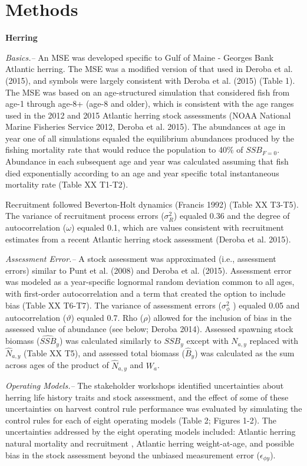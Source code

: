 \documentclass[]{article}
\begin{document}
\section{Methods}\label{methods}

\textbf{Herring}

\emph{Basics.--} An MSE was developed specific to Gulf of Maine -
Georges Bank Atlantic herring. The MSE was a modified version of that
used in Deroba et al. (2015), and symbols were largely consistent with
Deroba et al. (2015) (Table 1). The MSE was based on an age-structured
simulation that considered fish from age-1 through age-8+ (age-8 and
older), which is consistent with the age ranges used in the 2012 and
2015 Atlantic herring stock assessments (NOAA National Marine Fisheries
Service 2012, Deroba et al. 2015). The abundances at age in year one of
all simulations equaled the equilibrium abundances produced by the
fishing mortality rate that would reduce the population to 40\% of
\(SSB_{F=0}\). Abundance in each subsequent age and year was calculated
assuming that fish died exponentially according to an age and year
specific total instantaneous mortality rate (Table XX T1-T2).

Recruitment followed Beverton-Holt dynamics (Francis 1992) (Table XX
T3-T5). The variance of recruitment process errors (\(\sigma_R^2\))
equaled 0.36 and the degree of autocorrelation (\(\omega\)) equaled 0.1,
which are values consistent with recruitment estimates from a recent
Atlantic herring stock assessment (Deroba et al. 2015).

\emph{Assessment Error.--} A stock assessment was approximated (i.e.,
assessment errors) similar to Punt et al. (2008) and Deroba et al.
(2015). Assessment error was modeled as a year-specific lognormal random
deviation common to all ages, with first-order autocorrelation and a
term that created the option to include bias (Table XX T6-T7). The
variance of assessment errors (\(\sigma_\phi^2\) ) equaled 0.05 and
autocorrelation (\(\vartheta\)) equaled 0.7. Rho (\(\rho\)) allowed for
the inclusion of bias in the assessed value of abundance (see below;
Deroba 2014). Assessed spawning stock biomass (\(\widehat{SSB}_y\)) was
calculated similarly to \(SSB_y\) except with \(N_{a,y}\) replaced with
\(\widehat{N}_{a,y}\) (Table XX T5), and assessed total biomass
(\(\widehat{B}_y\)) was calculated as the sum across ages of the product
of \(\widehat{N}_{a,y}\) and \(W_a\).

\emph{Operating Models.--} The stakeholder workshops identified
uncertainties about herring life history traits and stock assessment,
and the effect of some of these uncertainties on harvest control rule
performance was evaluated by simulating the control rules for each of
eight operating models (Table 2; Figures 1-2). The uncertainties
addressed by the eight operating models included: Atlantic herring
natural mortality and recruitment , Atlantic herring weight-at-age, and
possible bias in the stock assessment beyond the unbiased measurement
error (\(\epsilon_{\phi y}\)).
\end{document}
